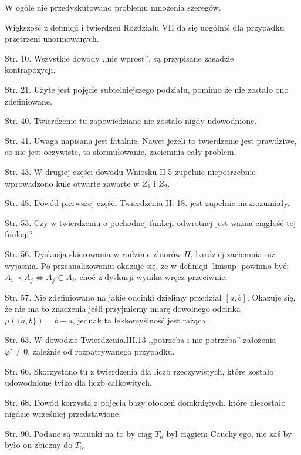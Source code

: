 \documentclass[a4paper,11pt]{article}
\begin{document}
\vspace{\spaceFour}

\start W ogóle nie przedyskutowano problemu mnożenia szeregów.

  
\start Większość z definicji i twierdzeń Rozdziału VII da się uogólnić
dla przypadku przetrzeni unormowanych.

\start Str. 10. Wszystkie dowody ,,nie wprost'', są przypisane
zasadzie \\ kontrapozycji.

\start Str. 21. Użyte jest pojęcie subtelniejszego podziału, pomimo że
nie zostało ono zdefiniowane.

\start Str. 40. Twierdzenie tu zapowiedziane nie zostało nigdy
udowodnione.


\start Str. 41. Uwaga napisana jest fatalnie. Nawet jeżeli to
twierdzenie jest prawdziwe, co nie jest oczywiste, to sformułowanie,
zaciemnia cały problem.

\start Str. 43. W drugiej części dowodu Wniosku II.5 zupełnie
niepotrzebnie wprowadzono kule otwarte zawarte w $Z_{ 1 }$ i
$Z_{ 2 }$.

\start Str. 48. Dowód pierwszej części Twierdzenia II. 18. jest
zupełnie niezrozumiały.

\start Str. 53. Czy w twierdzeniu o pochodnej funkcji odwrotnej jest
ważna ciągłość tej funkcji?

\start Str. 56. Dyskusja skierowania w rodzinie zbiorów $\Pi$,
bardziej zaciemnia niż wyjasnia. Po przeanalizowaniu okazuje się, że w
definicji $\limsup$ powinno być: \\$A_{ i } \prec A_{ j }
\Leftrightarrow A_{ j } \subset A_{ i
}$, choć z dyskusji wynika wręcz przeciwnie.
  
\start Str. 57. Nie zdefiniowano na jakie odcinki dzielimy przedział
$[ a, b
]$. Okazuje się, że nie ma to znaczenia jeśli przyjmiemy miarę
dowolnego odcinka $\mu ( \{ a, b \} ) = b -
a$, jednak ta lekkomyślność jest rażąca.

\start Str. 63. W dowodzie Twierdzenia.III.13 ,,potrzeba i nie
potrzeba'' założenia $\varphi' \neq 0$, zależnie od rozpatrywanego
przypadku.

\start Str. 66. Skorzystano tu z twierdzenia dla liczb rzeczywistych,
które zostało udowodnione tylko dla liczb całkowitych.

\start Str. 68. Dowód korzysta z pojęcia bazy otoczeń domkniętych,
które niezostało nigdzie wcześniej przedstawione.

\start Str. 90. Podane są warunki na to by ciąg $T_{ n }$ był ciągiem
Cauchy`ego, nie zaś by było on zbieżny do $T_{ 0 }$.
\end{document}
